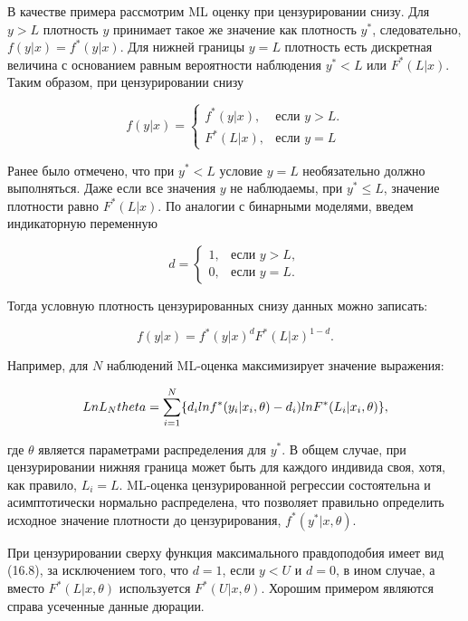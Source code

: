 В качестве примера рассмотрим ML оценку при цензурировании снизу. Для $y>L$ плотность $y$ принимает такое же значение как плотность $y^{*}$, следовательно, $f(y|x)=f^{*}(y|x)$. Для нижней границы $y=L$ плотность есть дискретная величина с основанием равным вероятности наблюдения $y^{*}<L$ или $F^{*}(L|x)$. Таким образом, при цензурировании снизу 

\[
f(y|x)=
\begin{cases}
f^{*}(y|x),& \text{если $y>L$}.\\
F^{*}(L|x),& \text{если $y=L$}
\end{cases}
\]


Ранее было отмечено, что при $y^{*}<L$ условие $y=L$ необязательно должно выполняться. Даже если все значения $y$ не наблюдаемы, при $y^{*}{\leq}L$, значение плотности равно $F^{*}(L|x)$. По аналогии с бинарными моделями, введем индикаторную переменную 

\begin{equation}
d=
\begin{cases}
1, & \text{если $y>L$}, \\
0, & \text{если $y=L$}.
\end{cases}
\end{equation}


Тогда условную плотность цензурированных снизу данных можно записать:

\begin{equation}
f(y|x)=f^{*}(y|x)^{d}F^{*}(L|x)^{1-d}.
\end{equation}



Например, для $N$ наблюдений ML-оценка максимизирует значение выражения:

\begin{equation}
Ln{L_N{\\theta}}=\sum_{i=1}^{N} \lbrace{d_i}ln{f^{*}(y_i|x_i,\theta)-d_i)ln{F^{*}}(L_i|x_i,\theta)\rbrace} ,
\end{equation}


где $\theta$ является параметрами распределения для $y^{*}$. В общем случае, при цензурировании нижняя граница может быть для каждого индивида своя, хотя, как правило, $L_i=L$. ML-оценка цензурированной регрессии состоятельна и асимптотически нормально распределена, что позволяет правильно определить исходное значение плотности до цензурирования, $f^{*}(y^{*}|x,\theta)$.

При цензурировании сверху функция максимального правдоподобия имеет вид (16.8), за исключением того, что $d=1$, если $y<U$ и $d=0$, в ином случае, а вместо $F^{*}(L|x,\theta)$ используется $F^{*}(U|x,\theta)$. Хорошим примером являются справа усеченные данные дюрации. 


